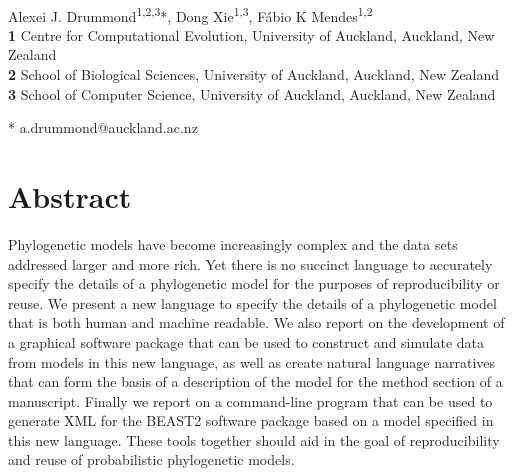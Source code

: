 \documentclass[10pt,letterpaper,table]{article}
\begin{document}
\vspace*{0.2in}

\begin{flushleft}
{\Large
\textbf{} %
}
\newline
\\
Alexei J. Drummond\textsuperscript{1,2,3}*,
Dong Xie\textsuperscript{1,3},
F\'{a}bio K Mendes\textsuperscript{1,2}
\\
\bigskip
\textbf{1} Centre for Computational Evolution, University of Auckland, Auckland, New Zealand
\\
\textbf{2} School of Biological Sciences, University of Auckland, Auckland, New Zealand
\\
\textbf{3} School of Computer Science, University of Auckland, Auckland, New Zealand
\\
\bigskip

% 
%

* a.drummond@auckland.ac.nz

\end{flushleft}
\section*{Abstract}
  Phylogenetic models have become increasingly complex and the data sets addressed larger and more rich.
  Yet there is no succinct language to accurately specify the details of a phylogenetic model for the purposes of reproducibility or reuse.
  We present a new language to specify the details of a phylogenetic model that is both human and machine readable.
  We also report on the development of a graphical software package that can be used to construct and simulate data from
  models in this new language, as well as create natural language narratives that can form the basis of a description of the model for the method section of a manuscript.
  Finally we report on a command-line program that can be used to generate XML for the BEAST2 software package based
  on a model specified in this new language.
  These tools together should aid in the goal of reproducibility and reuse of probabilistic phylogenetic models.
\end{document}

